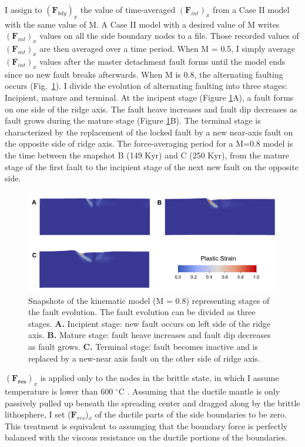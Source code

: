 \documentclass[letterpaper,12pt,notitle]{memphisthesis}                     %
\begin{document}
I assign to $(\boldsymbol{F}_{bdy})_x$ the value of time-averaged $(\boldsymbol{F}_{int})_x$ %
from a Case II model with the same value of M. A Case II model with a desired value of M writes $(\boldsymbol{F}_{int})_x$ values on all the side boundary nodes to a file. Those recorded values of $(\boldsymbol{F}_{int})_{x}$ are then averaged over a time period. When M = 0.5, I simply average $(\boldsymbol{F}_{int})_{x}$ values after the master detachment fault forms until the model ends since no new fault breaks afterwards.
When M is 0.8, the alternating faulting occurs (Fig.~\ref{fig:faultstage}). I divide the evolution of alternating faulting into three stages: Incipient, mature and terminal. At the incipent stage (Figure \ref{fig:faultstage}A), a fault forms on one side of the ridge axis. The fault heave increases and fault dip decreases as fault grows during the mature stage (Figure \ref{fig:faultstage}B). The terminal stage is characterized by the replacement of the locked fault by a new near-axis fault on the opposite side of ridge axis. The force-averaging period for a M=0.8 model is the time between the snapshot B (149 Kyr) and C (250 Kyr), from the mature stage of the first fault to the incipient stage of the next new fault on the opposite side. 
%
\begin{figure}[!htb]
	\centering
	\includegraphics[width=0.9\linewidth]{./figs/fault_stage.pdf}
	\caption{Snapshots of the kinematic model (M = 0.8) representing stages of the fault evolution. The fault evolution can be divided as three stages. \textbf{A.} Incipient stage: new fault occurs on left side of the ridge axis. \textbf{B.} Mature stage: fault heave increases and fault dip decreases as fault grows. \textbf{C.} Terminal stage: fault becomes inactive and is replaced by a new-near axis fault on the other side of ridge axis.}
	\label{fig:faultstage}
\end{figure}

$(\boldsymbol{F_{res}})_x$ is applied only to the nodes in the brittle state, in which I assume temperature is lower than 600 $^\circ$C \citep[e.g.,][]{Violay2012}. Assuming that the ductile mantle is only passively pulled up beneath the spreading center and dragged along by the brittle lithosphere, I set ($\boldsymbol{F}_{res}$)$_x$ of the ductile parts of the side boundaries to be zero. This treatment is equivalent to assumging that the boundary force is perfectly balanced with the viscous resistance on the ductile portions of the boundaries. %
\end{document}
